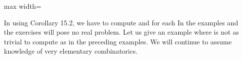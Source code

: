 \documentclass[11pt,oneside]{article}
\begin{document}
\begin{BookBody}
\begin{center}\begin{adjustbox}{max width=\linewidth}\end{adjustbox}\end{center}

In using Corollary 15.2, we have to compute  and  for each  In the examples and the exercises will pose no real problem. Let us give an example 
where  is not as trivial to compute as in the preceding examples. We will continue to assume knowledge of very elementary combinatorics.

\end{BookBody}

\BookNarrativetrue
\end{document}
